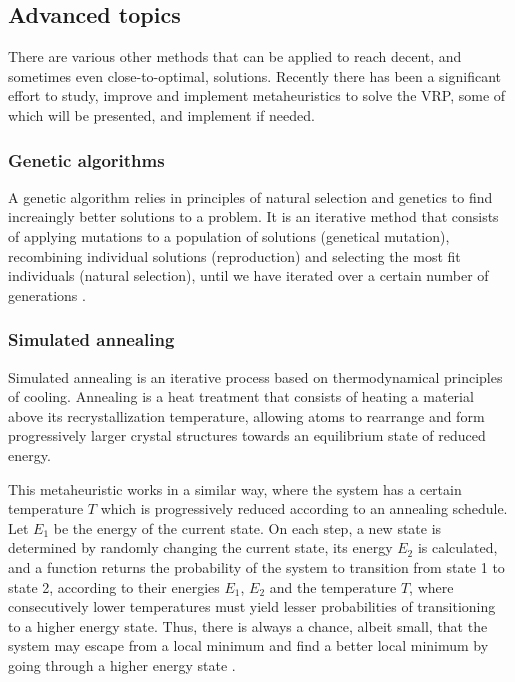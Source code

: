 \subsection{Advanced topics} \label{algorithm-vrp-advanced}
There are various other methods that can be applied to reach decent, and sometimes even close-to-optimal, solutions. Recently there has been a significant effort to study, improve and implement \glspl{metaheuristic} to solve the \acrshort*{VRP}, some of which will be presented, and implement if needed.
\subsubsection{Genetic algorithms}
A genetic algorithm relies in principles of \gls{natural selection} and genetics to find increaingly better solutions to a problem. It is an \gls{iterative} method that consists of applying mutations to a population of solutions (genetical mutation), recombining individual solutions (reproduction) and selecting the most fit individuals (natural selection), until we have iterated over a certain number of generations \cite{intro-genetic-algs}.
\subsubsection{Simulated annealing}
Simulated annealing is an \gls{iterative} process based on thermodynamical principles of cooling. Annealing is a heat treatment that consists of heating a material above its recrystallization temperature, allowing atoms to rearrange and form progressively larger crystal structures towards an equilibrium state of reduced energy.\par
This metaheuristic works in a similar way, where the system has a certain temperature $T$ which is progressively reduced according to an annealing schedule. Let $E_1$ be the energy of the current state. On each step, a new state is determined by randomly changing the current state, its energy $E_2$ is calculated, and a function returns the probability of the system to transition from state 1 to state 2, according to their energies $E_1$, $E_2$ and the temperature $T$, where consecutively lower temperatures must yield lesser probabilities of transitioning to a higher energy state. Thus, there is always a chance, albeit small, that the system may escape from a local minimum and find a better local minimum by going through a higher energy state \cite{numerical-recipes}.
